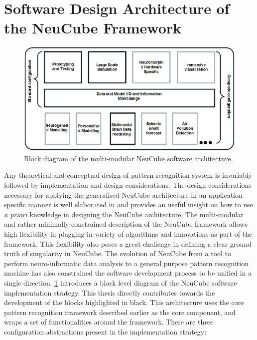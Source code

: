\section{Software Design Architecture of the NeuCube Framework}

\begin{figure}
	\centering
	\includegraphics[width=\linewidth]{fig/neucube/neucube_multimodular.png}
	\caption{Block diagram of the multi-modular NeuCube software architecture.}
	\label{fig:neucube_multimodular}
\end{figure}

Any theoretical and conceptual design of pattern recognition system is invariably followed by implementation and design considerations. The design considerations necessary for applying the generalised NeuCube architecture in an application specific manner is well elaborated in \citep{scott2015thesis} and provides an useful insight on how to use \emph{a priori} knowledge in designing the NeuCube architecture. The multi-modular and rather minimally-constrained description of the NeuCube framework allows high flexibility in plugging in variety of algorithms and innovations as part of the framework. This flexibility also poses a great challenge in defining a clear ground truth of singularity in NeuCube. The evolution of NeuCube from a tool to perform neuro-informatic data analysis to a general purpose pattern recognition machine has also constrained the software development process to be unified in a single direction. \figurename \ref{fig:neucube_multimodular} introduces a block level diagram of the NeuCube software implementation strategy. This thesis directly contributes towards the development of the blocks highlighted in black. This architecture uses the core pattern recognition framework described earlier as the core component, and wraps a set of functionalities around the framework. There are three configuration abstractions present in the implementation strategy:


